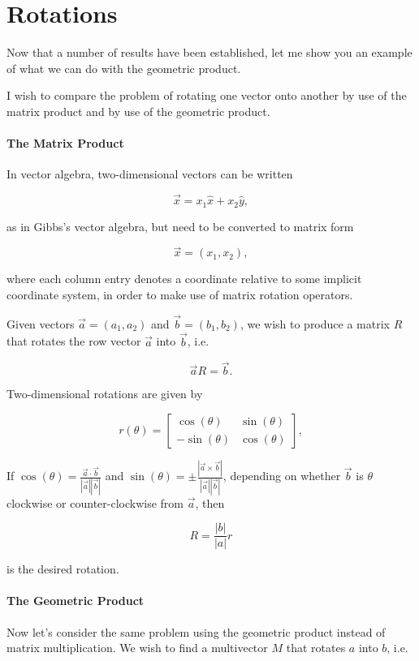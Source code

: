 \documentclass{article}
\begin{document}
\section{Rotations}\label{spinors}

Now that a number of results have been established, let me show you an
example of what we can do with the geometric product.

I wish to compare the problem of rotating one vector onto another by use of the matrix product and by use of the geometric product.

\paragraph{The Matrix Product}

In vector algebra, two-dimensional vectors can be written

$$\vec x = x_1 \hat x + x_2 \hat y,$$

as in Gibbs's vector algebra, but need to be converted to matrix form 

$$\vec x = (x_1, x_2),$$

where each column entry denotes a coordinate relative to some implicit coordinate system, in order to make use of matrix rotation operators.

Given vectors $\vec a = (a_1, a_2)$ and $\vec b = (b_1, b_2)$, we wish to produce a matrix $R$ that rotates the row vector $\vec a$ into $\vec b$, i.e.

$$\vec a R = \vec b.$$

Two-dimensional rotations are given by

$$ r(\theta) = \begin{bmatrix}
      \cos(\theta) & \sin(\theta) \\
      - \sin(\theta) & \cos(\theta)
  \end{bmatrix},$$

If $\cos(\theta) = \frac{\vec a \cdot \vec b}{|\vec a||\vec b|}$ and $\sin(\theta) = \pm \frac{|\vec a \times \vec b|}{|\vec a||\vec b|}$, depending on whether $\vec b$ is $\theta$ clockwise or counter-clockwise from $\vec a$, then

$$R = \frac{|b|}{|a|} r$$

is the desired rotation.

\paragraph{The Geometric Product} Now let's consider the same problem using the geometric product instead of matrix multiplication. We wish to find a multivector $M$ that rotates $a$ into $b$, i.e.
\end{document}

